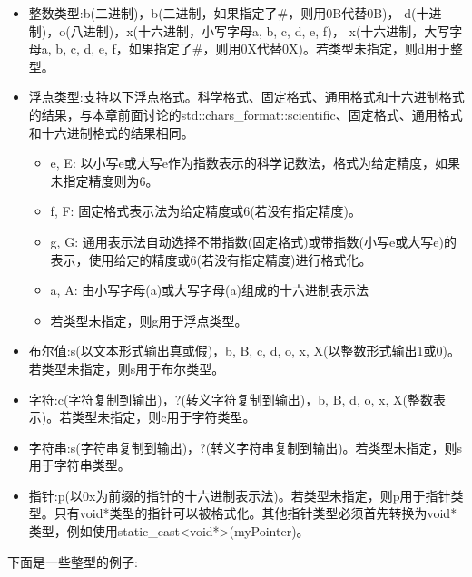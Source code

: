 \begin{itemize}
\item
整数类型:b(二进制)，b(二进制，如果指定了\#，则用0B代替0B)， d(十进制)，o(八进制)，x(十六进制，小写字母a, b, c, d, e, f)， x(十六进制，大写字母a, b, c, d, e, f，如果指定了\#，则用0X代替0X)。若类型未指定，则d用于整型。

\item
浮点类型:支持以下浮点格式。科学格式、固定格式、通用格式和十六进制格式的结果，与本章前面讨论的std::chars\_format::scientific、固定格式、通用格式和十六进制格式的结果相同。

\begin{itemize}
\item
e, E: 以小写e或大写e作为指数表示的科学记数法，格式为给定精度，如果未指定精度则为6。

\item
f, F: 固定格式表示法为给定精度或6(若没有指定精度)。

\item
g, G: 通用表示法自动选择不带指数(固定格式)或带指数(小写e或大写e)的表示，使用给定的精度或6(若没有指定精度)进行格式化。

\item
a, A: 由小写字母(a)或大写字母(a)组成的十六进制表示法

\item
若类型未指定，则g用于浮点类型。
\end{itemize}

\item
布尔值:s(以文本形式输出真或假)，b, B, c, d, o, x, X(以整数形式输出1或0)。若类型未指定，则s用于布尔类型。

\item
字符:c(字符复制到输出)，?(转义字符复制到输出)，b, B, d, o, x, X(整数表示)。若类型未指定，则c用于字符类型。

\item
字符串:s(字符串复制到输出)，?(转义字符串复制到输出)。若类型未指定，则s用于字符串类型。

\item
指针:p(以0x为前缀的指针的十六进制表示法)。若类型未指定，则p用于指针类型。只有void*类型的指针可以被格式化。其他指针类型必须首先转换为void*类型，例如使用static\_cast<void*>(myPointer)。
\end{itemize}

下面是一些整型的例子:



